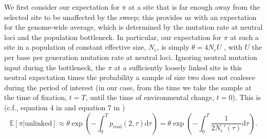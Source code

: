 \documentclass[]{article}
\begin{document}
We first consider our expectation for $\pi$ at a site that is far enough away from the selected site to be unaffected by the sweep; this provides us with an expectation for the genome-wide average, which is determined by the mutation rate at neutral loci and the population bottleneck.
In particular, our expectation for $\pi$ at such a site in a population of constant effective size, $N_e$, is simply $\theta = 4 N_e U$ \citep{watterson1975number}, with $U$ the per base per generation mutation rate at neutral loci.
Ignoring neutral mutation input during the bottleneck, the $\pi$ at a sufficiently loosely linked site is this neutral expectation times the probability a sample of size two does not coalesce during the period of interest (in our case, from the time we take the sample at the time of fixation, $t=T$, until the time of environmental change, $t=0$).
This is (c.f., equation 4 in \citealp{slatkin1991pairwise} and equation 7 in \citealp{griffiths1994sampling})
\begin{equation}\label{eq:EH_rescue_loose}
\mathbb{E}[\pi | \mathrm{unlinked}]\approx \theta \exp \left( - \int_0^T p_{\mathrm{coal}}(2,\tau) \mathrm{d}\tau \right) = \theta \exp \left( - \int_0^T \frac{1}{2N_e'(\tau)} \mathrm{d}\tau \right). 
\end{equation}
\end{document}

